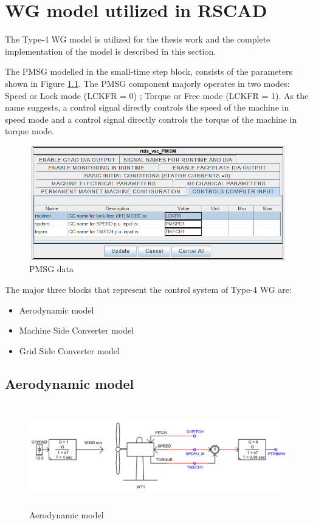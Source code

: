 \chapter{WG model utilized in RSCAD}

The Type-4 \gls{WG} model is utilized for the thesis work and the complete implementation of the model is described in this section. 

The \gls{PMSG} modelled in the small-time step block, consists of the parameters shown in Figure \ref{fig:PMSG_block_para}. The \gls{PMSG} component majorly operates in two modes: Speed or Lock mode (LCKFR = 0) ; Torque or Free mode (LCKFR = 1).
As the name suggests, a control signal directly controls the speed of the machine in speed mode and a control signal directly controls the torque of the machine in torque mode.  

\begin{figure}[H]
\centering
    \includegraphics[height = 5cm,width = 11.5cm]{Diagrams/Appendix_A/PMSG_block_para.PNG}
    \caption{PMSG data}
    \label{fig:PMSG_block_para}
\end{figure}

The major three blocks that represent the control system of Type-4 \gls{WG} are:
\begin{itemize}
    \item Aerodynamic model
    \item Machine Side Converter model
    \item Grid Side Converter model
\end{itemize}

\section{Aerodynamic model}

\begin{figure}[]
\centering
    \includegraphics[height = 4.5cm,width = 15.5cm]{Diagrams/Appendix_A/Aerodynamic_model.PNG}
    \caption{Aerodynamic model}
    \label{fig:Aerodynamic_model}
\end{figure}

